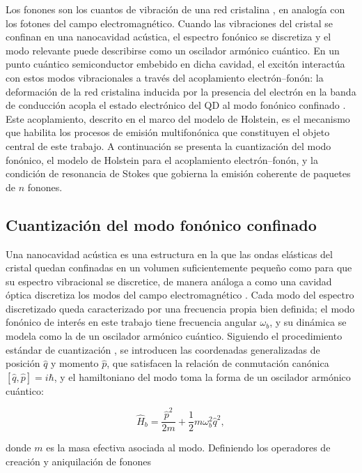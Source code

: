 Los fonones son los cuantos de vibración de una red cristalina \cite{kittel2005}, en analogía con los fotones del campo electromagnético. Cuando las vibraciones del cristal se confinan en una nanocavidad acústica, el espectro fonónico se discretiza y el modo relevante puede describirse como un oscilador armónico cuántico. En un punto cuántico semiconductor embebido en dicha cavidad, el excitón interactúa con estos modos vibracionales a través del acoplamiento electrón--fonón: la deformación de la red cristalina inducida por la presencia del electrón en la banda de conducción acopla el estado electrónico del QD al modo fonónico confinado \cite{stock2011}. Este acoplamiento, descrito en el marco del modelo de Holstein, es el mecanismo que habilita los procesos de emisión multifonónica que constituyen el objeto central de este trabajo. A continuación se presenta la cuantización del modo fonónico, el modelo de Holstein para el acoplamiento electrón--fonón, y la condición de resonancia de Stokes que gobierna la emisión coherente de paquetes de $n$ fonones.

\subsection{Cuantización del modo fonónico confinado}
\label{sec:cuantizacion_fononico}

Una nanocavidad acústica es una estructura en la que las ondas elásticas del cristal quedan confinadas en un volumen suficientemente pequeño como para que su espectro vibracional se discretice, de manera análoga a como una cavidad óptica discretiza los modos del campo electromagnético \cite{kittel2005,vahala2003}. Cada modo del espectro  discretizado queda caracterizado por una frecuencia propia bien  definida; el modo fonónico de interés en este trabajo tiene frecuencia  angular $\omega_b$, y su dinámica se modela como la de un oscilador  armónico cuántico. Siguiendo el procedimiento estándar de cuantización \cite{gerry2005,fox2006}, se introducen las coordenadas generalizadas de posición $\hat{q}$ y momento $\hat{p}$, que satisfacen la relación de conmutación canónica $[\hat{q},\hat{p}] = i\hbar$, y el hamiltoniano del modo toma la forma de un oscilador armónico cuántico:

\begin{equation}
	\hat{H}_b = \frac{\hat{p}^2}{2m} + \frac{1}{2}m\omega_b^2\hat{q}^2,
	\label{eq:Hb_cuadraturas}
\end{equation}

donde $m$ es la masa efectiva asociada al modo. Definiendo los operadores de creación y aniquilación de fonones

